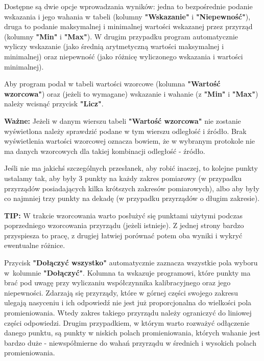 Dostępne są dwie opcje wprowadzania wyników: jedna to bezpośrednie podanie wskazania i jego wahania w tabeli (kolumny \textbf{"Wskazanie"} i \textbf{"Niepewność"}), druga to podanie maksymalnej i minimalnej wartości wskazanej przez przyrząd (kolumny \textbf{"Min"} i \textbf{"Max"}). W drugim przypadku program automatycznie wyliczy wskazanie (jako średnią arytmetyczną wartości maksymalnej i minimalnej) oraz niepewność (jako różnicę wyliczonego wskazania i wartości minimalnej).

Aby program podał w tabeli wartości wzorcowe (kolumna \textbf{"Wartość wzorcowa"}) oraz (jeżeli to wymagane) wskazanie i wahanie (z \textbf{"Min"} i \textbf{"Max"}) należy wcisnąć przycisk \textbf{"Licz"}. 

\textbf{Ważne:} Jeżeli w danym wierszu tabeli \textbf{"Wartość wzorcowa"} nie zostanie wyświetlona należy sprawdzić podane w tym wierszu odległość i źródło. Brak wyświetlenia wartości wzorcowej oznacza bowiem, że w wybranym protokole nie ma danych wzorcowych dla takiej kombinacji odległość - źródło.

Jeśli nie ma jakichś szczególnych przesłanek, aby robić inaczej, to kolejne punkty ustalamy tak, aby były 3 punkty na każdy zakres pomiarowy (w przypadku przyrządów posiadających kilka krótszych zakresów pomiarowych), albo aby były co najmniej trzy punkty na dekadę (w przypadku przyrządów o długim zakresie).

\textbf{TIP:} W trakcie wzorcowania warto posłużyć się punktami użytymi podczas poprzedniego wzorcowania przyrządu (jeżeli istnieje). Z jednej strony bardzo przyspiesza to pracę, z drugiej łatwiej porównać potem oba wyniki i wykryć ewentualne różnice.

Przycisk \textbf{"Dołączyć wszystko"} automatycznie zaznacza wszystkie pola wyboru w~kolumnie \textbf{"Dołączyć"}. Kolumna ta wskazuje programowi, które punkty ma brać pod uwagę przy wyliczaniu współczynnika kalibracyjnego oraz jego niepewności. Zdarzają się przyrządy, które w górnej części swojego zakresu ulegają nasyceniu i ich odpowiedź nie jest już proporcjonalna do wielkości pola promieniowania. Wtedy zakres takiego przyrządu należy ograniczyć do liniowej części odpowiedzi. Drugim przypadkiem, w którym warto rozważyć odłączenie danego punktu, są punkty w niskich polach promieniowania, których wahanie jest bardzo duże - niewspółmierne do wahań przyrządu w średnich i wysokich polach promieniowania.

